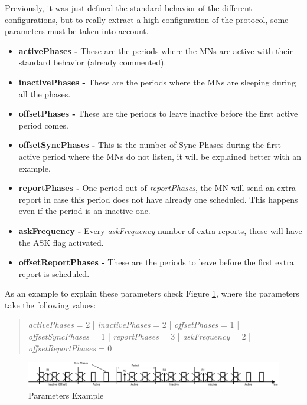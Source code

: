 Previously, it was just defined the standard behavior of the different configurations, but to really extract a high configuration of the protocol, some 
parameters must be taken into account.

\begin{itemize}
 \item \textbf{activePhases -} These are the periods where the \acp{MN} are active with their standard behavior (already commented).
 \item \textbf{inactivePhases -} These are the periods where the \acp{MN} are sleeping during all the phases.
 \item \textbf{offsetPhases -} These are the periods to leave inactive before the first active period comes.
 \item \textbf{offsetSyncPhases -} This is the number of Sync Phases during the first active period where the \acp{MN} do not listen, it will be explained 
better with an example.
 \item \textbf{reportPhases -} One period out of \textit{reportPhases}, the \ac{MN} will send an extra report in case this period does not have already one
scheduled. This happens even if the period is an inactive one.
 \item \textbf{askFrequency -} Every \textit{askFrequency} number of extra reports, these will have the ASK flag activated.
 \item \textbf{offsetReportPhases -} These are the periods to leave before the first extra report is scheduled.
\end{itemize}
 
As an example to explain these parameters check Figure \ref{fig:parametersphases}, where the parameters take the following values: 

\begin{quote}
 \textit{activePhases} = 2 | \textit{inactivePhases} = 2 | \textit{offsetPhases} = 1 | \textit{offsetSyncPhases} = 1 | \textit{reportPhases} = 3 
| \textit{askFrequency} = 2 | \textit{offsetReportPhases} = 0
\end{quote}

\begin{figure}[ht]
 \begin{center}
  \includegraphics[width=1\textwidth]{parametersphases.eps}
 \end{center}
 \caption{Parameters Example}
 \label{fig:parametersphases}
\end{figure}

